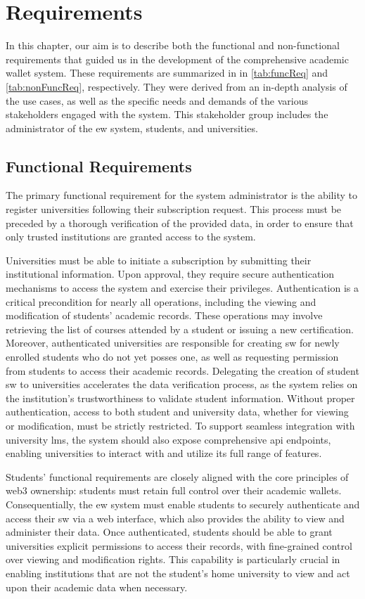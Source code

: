 \chapter{Requirements}
\label{chap:requirements}
In this chapter, our aim is to describe both the functional and non-functional requirements that guided us in the development of the comprehensive academic wallet system. These requirements are summarized in in \cref{tab:funcReq} and \cref{tab:nonFuncReq}, respectively. They were derived from an in-depth analysis of the use cases, as well as the specific needs and demands of the various stakeholders engaged with the system. This stakeholder group includes the administrator of the \acrfull{ew} system, students, and universities.

\section{Functional Requirements}
The primary functional requirement for the system administrator is the ability to register universities following their subscription request. This process must be preceded by a thorough verification of the provided data, in order to ensure that only trusted institutions are granted access to the system.

Universities must be able to initiate a subscription by submitting their institutional information. Upon approval, they require secure authentication mechanisms to access the system and exercise their privileges. Authentication is a critical precondition for nearly all operations, including the viewing and modification of students' academic records. These operations may involve retrieving the list of courses attended by a student or issuing a new certification. Moreover, authenticated universities are responsible for creating \acrfull{sw} for newly enrolled students who do not yet posses one, as well as requesting permission from students to access their academic records. Delegating the creation of student \acrshort{sw} to universities accelerates the data verification process, as the system relies on the institution's trustworthiness to validate student information. Without proper authentication, access to both student and university data, whether for viewing or modification, must be strictly restricted. To support seamless integration with university \acrfull{lms}, the system should also expose comprehensive \acrfull{api} endpoints, enabling universities to interact with and utilize its full range of features.

Students' functional requirements are closely aligned with the core principles of \Gls{web3} ownership: students must retain full control over their academic wallets. Consequentially, the \acrshort{ew} system must enable students to securely authenticate and access their \acrshort{sw} via a web interface, which also provides the ability to view and administer their data. Once authenticated, students should be able to grant universities explicit permissions to access their records, with fine-grained control over viewing and modification rights. This capability is particularly crucial in enabling institutions that are not the student's home university to view and act upon their academic data when necessary.

